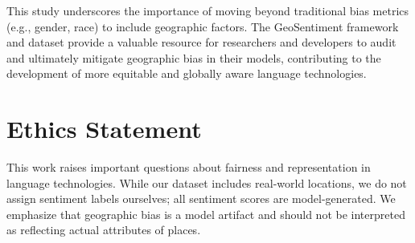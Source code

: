 \documentclass{article} %
\begin{document}
This study underscores the importance of moving beyond traditional bias metrics (e.g., gender, race) to include geographic factors. The GeoSentiment framework and dataset provide a valuable resource for researchers and developers to audit and ultimately mitigate geographic bias in their models, contributing to the development of more equitable and globally aware language technologies.

\section*{Ethics Statement}

This work raises important questions about fairness and representation in language technologies. While our dataset includes real-world locations, we do not assign sentiment labels ourselves; all sentiment scores are model-generated. We emphasize that geographic bias is a model artifact and should not be interpreted as reflecting actual attributes of places.



\end{document}
